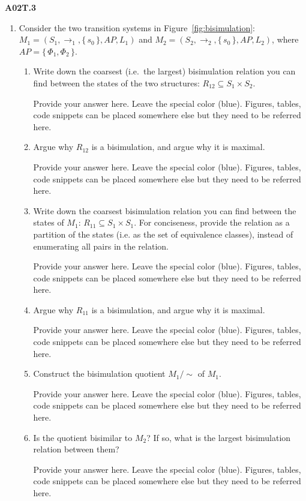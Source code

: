 \documentclass[12pt,a4paper]{article}
\begin{document}
\begin{description}
\item{\bf A02T.3}
\begin{enumerate}
\item Consider the two transition systems in
  Figure~\ref{fig:bisimulation}: $M_1 = (S_1, \rightarrow_1, \{\,s_0\,\}, AP, L_1)$ and
$M_2 = (S_2, \rightarrow_2, \{\,s_0\,\}, AP, L_2)$, where $AP = \{\, \Phi_1, \Phi_2 \,\}$.
\begin{enumerate}
\item Write down the coarsest (i.e.\ the largest) bisimulation relation you can find between the states of the two structures:
$R_{12} \subseteq S_1 \times S_2$. %
\ifwithanswers
\color{blue}
\par
Provide your answer here. Leave the special color (blue). Figures, tables, code snippets can be placed somewhere else but they need to be referred here.
\color{black}
\fi
%
\item Argue why $R_{12}$ is a bisimulation, and argue why it is maximal.
%
\ifwithanswers
\color{blue}
\par
Provide your answer here. Leave the special color (blue). Figures, tables, code snippets can be placed somewhere else but they need to be referred here.
\color{black}
\fi
%
\item Write down the coarsest bisimulation relation you can find between the states of $M_1$:
$R_{11} \subseteq S_1 \times S_1$. For conciseness, provide the relation as a partition of the states (i.e. as the set of equivalence classes), instead of enumerating all pairs in the relation.
%
\ifwithanswers
\color{blue}
\par
Provide your answer here. Leave the special color (blue). Figures, tables, code snippets can be placed somewhere else but they need to be referred here.
\color{black}
\fi
%
\item Argue why $R_{11}$ is a bisimulation, and argue why it is maximal.
%
\ifwithanswers
\color{blue}
\par
Provide your answer here. Leave the special color (blue). Figures, tables, code snippets can be placed somewhere else but they need to be referred here.
\color{black}
\fi
%
\item Construct the bisimulation quotient $M_1 / \sim$ of $M_1$.
%
\ifwithanswers
\color{blue}
\par
Provide your answer here. Leave the special color (blue). Figures, tables, code snippets can be placed somewhere else but they need to be referred here.
\color{black}
\fi
%
\item Is the quotient bisimilar to $M_2$? If so, what is the largest bisimulation relation between them?
%
\ifwithanswers
\color{blue}
\par
Provide your answer here. Leave the special color (blue). Figures, tables, code snippets can be placed somewhere else but they need to be referred here.
\color{black}
\fi
%
\end{enumerate}
\end{enumerate}

\end{description}
\end{document}
